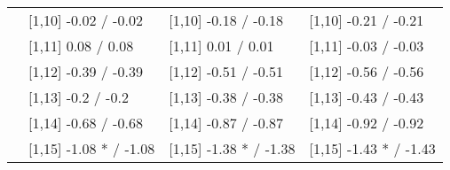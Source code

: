 \begin{table}
\begin{tabular}[t]{llll}
 & {}[1,10] -0.02  / -0.02 & {}[1,10] -0.18  / -0.18 & {}[1,10] -0.21  / -0.21\\
 & {}[1,11] 0.08  / 0.08 & {}[1,11] 0.01  / 0.01 & {}[1,11] -0.03  / -0.03\\
 & {}[1,12] -0.39  / -0.39 & {}[1,12] -0.51  / -0.51 & {}[1,12] -0.56  / -0.56\\
\addlinespace
 & {}[1,13] -0.2  / -0.2 & {}[1,13] -0.38  / -0.38 & {}[1,13] -0.43  / -0.43\\
 & {}[1,14] -0.68  / -0.68 & {}[1,14] -0.87  / -0.87 & {}[1,14] -0.92  / -0.92\\
 & {}[1,15] -1.08 * / -1.08 & {}[1,15] -1.38 * / -1.38 & {}[1,15] -1.43 * / -1.43\\
\bottomrule
\end{tabular}
\end{table}
